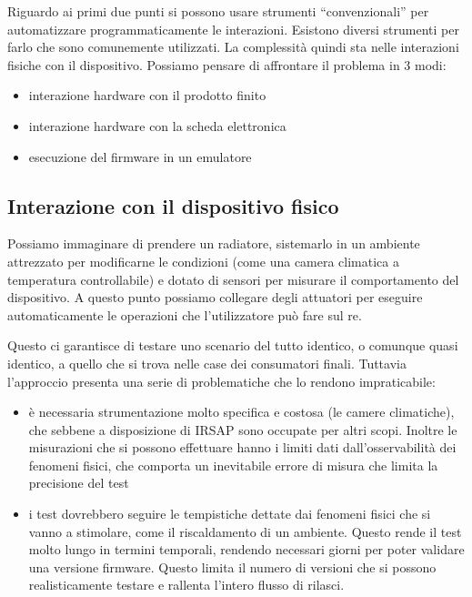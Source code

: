 \documentclass[12pt,a4paper,twoside,titlepage]{book}
\begin{document}
Riguardo ai primi due punti si possono usare strumenti ``convenzionali'' per automatizzare programmaticamente
le interazioni. Esistono diversi strumenti per farlo che sono comunemente utilizzati. 
La complessità quindi sta nelle interazioni fisiche con il dispositivo. Possiamo pensare di affrontare il problema in 3 modi:

\begin{itemize}
    \item interazione hardware con il prodotto finito
    \item interazione hardware con la scheda elettronica
    \item esecuzione del \gls{firmware} in un emulatore
\end{itemize}

\subsection{Interazione con il dispositivo fisico}

Possiamo immaginare di prendere un radiatore, sistemarlo in un ambiente attrezzato per 
modificarne le condizioni (come una camera climatica a temperatura controllabile) e dotato 
di sensori per misurare il comportamento del dispositivo. A questo punto possiamo collegare degli 
attuatori per eseguire automaticamente le operazioni che l'utilizzatore può fare sul \acrshort{re}. 

Questo ci garantisce di testare uno scenario del tutto identico, o comunque quasi identico, a quello  
che si trova nelle case dei consumatori finali. Tuttavia l'approccio presenta una serie di problematiche 
che lo rendono impraticabile:
\begin{itemize}
    \item è necessaria strumentazione molto specifica e costosa (le camere climatiche),
        che sebbene a disposizione di IRSAP sono occupate per altri scopi. Inoltre le misurazioni che si 
        possono effettuare hanno i limiti dati dall'osservabilità dei fenomeni fisici, che comporta un 
        inevitabile errore di misura che limita la precisione del test

    \item i test dovrebbero seguire le tempistiche dettate dai fenomeni fisici che si vanno a stimolare, 
        come il riscaldamento di un ambiente. Questo rende il test molto lungo in termini temporali, 
        rendendo necessari giorni per poter validare una versione firmware. Questo limita il numero di 
        versioni che si possono realisticamente testare e rallenta l'intero flusso di rilasci. 
\end{itemize}
\end{document}

